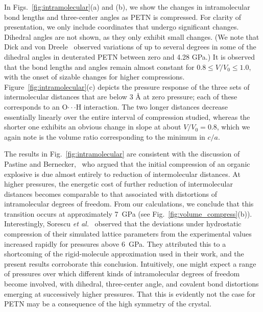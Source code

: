 \documentclass[prb,aps,nobibnotes,twocolumn,doublespace,twocolumngrid,superbib]{revtex4}
\begin{document}
In Figs.~\ref{fig:intramolecular}(a) and (b), we show the changes in
intramolecular bond lengths and three-center angles as PETN is
compressed.  For clarity of presentation, we only include coordinates that
undergo significant changes.  Dihedral angles are not shown, as they
only exhibit small changes.  (We note that Dick and von
Dreele~\cite{Dick_1997} observed variations of up to several degrees
in some of the dihedral angles in deuterated PETN between zero
and 4.28 GPa.)  It is observed that the bond lengths and angles remain
almost constant for $ 0.8 \leq V/V_0 \leq 1.0$, with the onset of
sizable changes for higher compressions.
Figure~\ref{fig:intramolecular}(c) depicts the pressure response of 
the three sets of intermolecular distances that are below 3 \AA\/ at zero
pressure; each of these corresponds to an O$\cdot\cdot\cdot$H
interaction.  The two longer distances decrease essentially linearly
over the entire interval of compression studied, whereas the shorter
one exhibits an obvious change in slope at about $V/V_0=0.8$, which we
again note is the volume ratio corresponding to the minimum in $c/a$.


The results in Fig.~\ref{fig:intramolecular} are consistent with the
discussion of Pastine and Bernecker,~\cite{Pastine_1974v45} who argued
that the initial compression of an organic explosive is due almost
entirely to reduction of intermolecular distances.  At higher
pressures, the energetic cost of further reduction of intermolecular
distances becomes comparable to that associated with distortions of
intramolecular degrees of freedom.  From our calculations, we conclude
that this transition occurs at approximately 7~GPa (see
Fig.~\ref{fig:volume_compress}(b)).  Interestingly, Sorescu {\it et
al.}~\cite{Sorescu_1999v103} observed that the deviations under
hydrostatic compression of their simulated lattice parameters from the
experimental values increased rapidly for pressures above 6~GPa.  They
attributed this to a shortcoming of the rigid-molecule approximation
used in their work, and the present results corroborate this
conclusion.  Intuitively, one might expect a range of pressures over
which different kinds of intramolecular degrees of freedom become
involved, with dihedral, three-center angle, and covalent bond
distortions emerging at successively higher pressures.  That this is
evidently not the case for PETN may be a consequence of the high
symmetry of the crystal.
\end{document}
